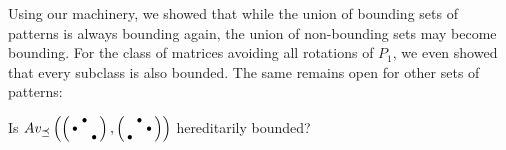 Using our machinery, we showed that while the union of bounding sets of patterns is always bounding again, the union of non-bounding sets may become bounding. For the class of matrices avoiding all rotations of $P_1$, we even showed that every subclass is also bounded. The same remains open for other sets of patterns:
\begin{ques}
Is $Av_{\preceq}\left(\left(\begin{smallmatrix} &\bullet& \\\bullet& & \\ & &\bullet\end{smallmatrix}\right),\left(\begin{smallmatrix} &\bullet& \\ & &\bullet\\\bullet& & \end{smallmatrix}\right)\right)$ hereditarily bounded?
\end{ques}
